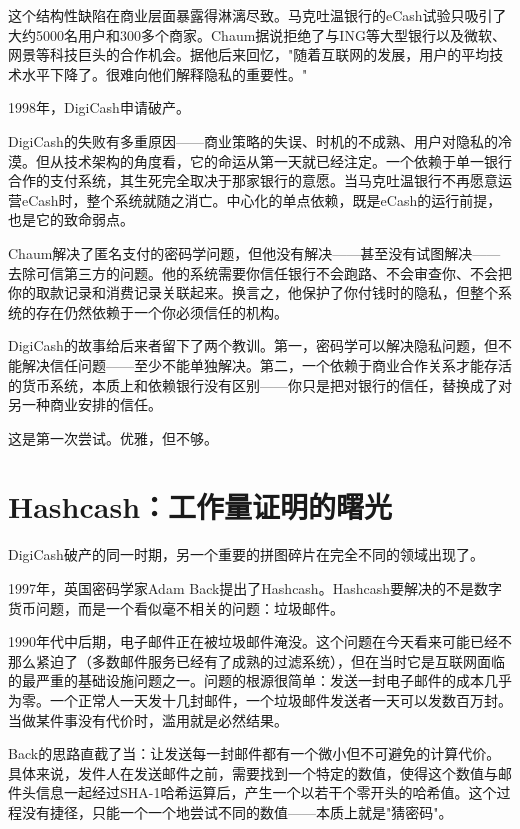\documentclass[a4paper,12pt,openany]{ctexbook}
\begin{document}
这个结构性缺陷在商业层面暴露得淋漓尽致。马克吐温银行的eCash试验只吸引了大约5000名用户和300多个商家。Chaum据说拒绝了与ING等大型银行以及微软、网景等科技巨头的合作机会。据他后来回忆，"随着互联网的发展，用户的平均技术水平下降了。很难向他们解释隐私的重要性。"

1998年，DigiCash申请破产。

DigiCash的失败有多重原因——商业策略的失误、时机的不成熟、用户对隐私的冷漠。但从技术架构的角度看，它的命运从第一天就已经注定。一个依赖于单一银行合作的支付系统，其生死完全取决于那家银行的意愿。当马克吐温银行不再愿意运营eCash时，整个系统就随之消亡。中心化的单点依赖，既是eCash的运行前提，也是它的致命弱点。

Chaum解决了匿名支付的密码学问题，但他没有解决——甚至没有试图解决——去除可信第三方的问题。他的系统需要你信任银行不会跑路、不会审查你、不会把你的取款记录和消费记录关联起来。换言之，他保护了你付钱时的隐私，但整个系统的存在仍然依赖于一个你必须信任的机构。

DigiCash的故事给后来者留下了两个教训。第一，密码学可以解决隐私问题，但不能解决信任问题——至少不能单独解决。第二，一个依赖于商业合作关系才能存活的货币系统，本质上和依赖银行没有区别——你只是把对银行的信任，替换成了对另一种商业安排的信任。

这是第一次尝试。优雅，但不够。


\section*{Hashcash：工作量证明的曙光}


DigiCash破产的同一时期，另一个重要的拼图碎片在完全不同的领域出现了。

1997年，英国密码学家Adam Back提出了Hashcash。Hashcash要解决的不是数字货币问题，而是一个看似毫不相关的问题：垃圾邮件。

1990年代中后期，电子邮件正在被垃圾邮件淹没。这个问题在今天看来可能已经不那么紧迫了（多数邮件服务已经有了成熟的过滤系统），但在当时它是互联网面临的最严重的基础设施问题之一。问题的根源很简单：发送一封电子邮件的成本几乎为零。一个正常人一天发十几封邮件，一个垃圾邮件发送者一天可以发数百万封。当做某件事没有代价时，滥用就是必然结果。

Back的思路直截了当：让发送每一封邮件都有一个微小但不可避免的计算代价。具体来说，发件人在发送邮件之前，需要找到一个特定的数值，使得这个数值与邮件头信息一起经过SHA-1哈希运算后，产生一个以若干个零开头的哈希值。这个过程没有捷径，只能一个一个地尝试不同的数值——本质上就是"猜密码"。
\end{document}
